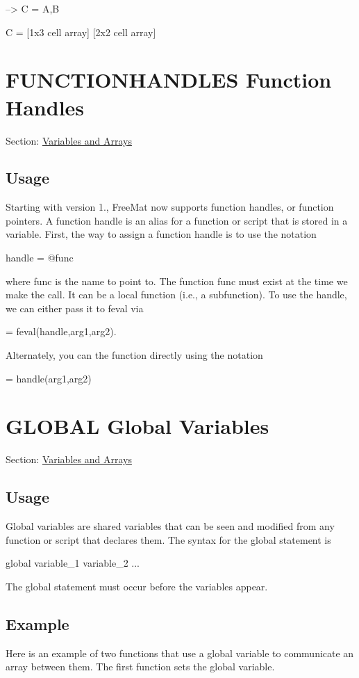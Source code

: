 \begin{DoxyVerbInclude}
--> C = {A,B}

C = 
 [1x3 cell array] [2x2 cell array] 
\end{DoxyVerbInclude}
 \hypertarget{variables_functionhandles}{}\section{F\-U\-N\-C\-T\-I\-O\-N\-H\-A\-N\-D\-L\-E\-S Function Handles}\label{variables_functionhandles}
Section\-: \hyperlink{sec_variables}{Variables and Arrays} \hypertarget{vtkwidgets_vtkxyplotwidget_Usage}{}\subsection{Usage}\label{vtkwidgets_vtkxyplotwidget_Usage}
Starting with version 1., Free\-Mat now supports {\ttfamily function handles}, or {\ttfamily function pointers}. A {\ttfamily function handle} is an alias for a function or script that is stored in a variable. First, the way to assign a function handle is to use the notation \begin{DoxyVerb}    handle = @func
\end{DoxyVerb}
 where {\ttfamily func} is the name to point to. The function {\ttfamily func} must exist at the time we make the call. It can be a local function (i.\-e., a subfunction). To use the {\ttfamily handle}, we can either pass it to {\ttfamily feval} via \begin{DoxyVerb}   [x,y] = feval(handle,arg1,arg2).
\end{DoxyVerb}
 Alternately, you can the function directly using the notation \begin{DoxyVerb}   [x,y] = handle(arg1,arg2)
\end{DoxyVerb}
 \hypertarget{variables_global}{}\section{G\-L\-O\-B\-A\-L Global Variables}\label{variables_global}
Section\-: \hyperlink{sec_variables}{Variables and Arrays} \hypertarget{vtkwidgets_vtkxyplotwidget_Usage}{}\subsection{Usage}\label{vtkwidgets_vtkxyplotwidget_Usage}
Global variables are shared variables that can be seen and modified from any function or script that declares them. The syntax for the {\ttfamily global} statement is \begin{DoxyVerb}  global variable_1 variable_2 ...
\end{DoxyVerb}
 The {\ttfamily global} statement must occur before the variables appear. \hypertarget{variables_struct_Example}{}\subsection{Example}\label{variables_struct_Example}
Here is an example of two functions that use a global variable to communicate an array between them. The first function sets the global variable.

